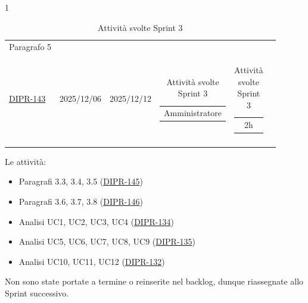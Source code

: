 \documentclass[a4paper,12pt]{article}
\begin{document}
\begin{table}[H]
\begin{spacing}{1}
\begin{longtable}{|p{4cm}|c|c|c|c|c|}
            \hline
            Paragrafo 5 & \begin{tabular}[c]{@{}c@{}} \href{https://7zpus.atlassian.net/browse/DIPR-147}{DIPR-147} \\\href{https://7zpus.atlassian.net/browse/DIPR-143}{DIPR-143} \end{tabular} & 2025/12/06 & 2025/12/12 & \begin{tabular}[c]{@{}c@{}} Amministratore \end{tabular} & \begin{tabular}[c]{@{}c@{}} \textcolor{green!50!black}{2h} \end{tabular} \\
            \hline
                \caption{Attività svolte Sprint 3}

    \end{longtable}
    \end{spacing}
\end{table}


Le attività:
\begin{itemize}
    \item Paragrafi 3.3, 3.4, 3.5 (\href{https://7zpus.atlassian.net/browse/DIPR-145}{DIPR-145})
    \item Paragrafi 3.6, 3.7, 3.8 (\href{https://7zpus.atlassian.net/browse/DIPR-146}{DIPR-146})
    \item Analisi UC1, UC2, UC3, UC4  (\href{https://7zpus.atlassian.net/browse/DIPR-134}{DIPR-134})
    \item Analisi UC5, UC6, UC7, UC8, UC9 (\href{https://7zpus.atlassian.net/browse/DIPR-135}{DIPR-135})
    \item Analisi UC10, UC11, UC12 (\href{https://7zpus.atlassian.net/browse/DIPR-132}{DIPR-132})
\end{itemize}
Non sono state portate a termine o reinserite nel backlog, dunque riassegnate allo Sprint successivo.\\
\end{document}
